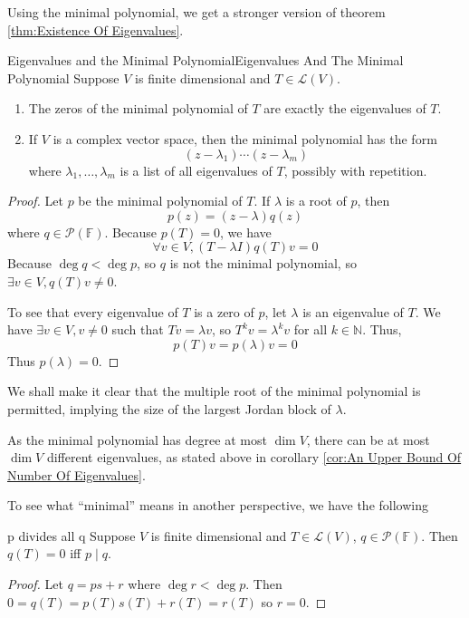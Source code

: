 \documentclass[../main.tex]{subfiles}
\begin{document}
Using the minimal polynomial, we get a stronger version of theorem \ref{thm:Existence Of Eigenvalues}.
\begin{theorem}{Eigenvalues and the Minimal Polynomial}{Eigenvalues And The Minimal Polynomial}
Suppose $V$ is finite dimensional and $T\in \mathscr{L}(V)$.
\begin{enumerate}
	\item The zeros of the minimal polynomial of $T$ are exactly the eigenvalues of $T$.
	\item If $V$ is a complex vector space, then the minimal polynomial has the form
		\begin{equation*}
			(z-\lambda_1) \cdots (z-\lambda_m)
		\end{equation*}
	where $\lambda_1, \ldots ,\lambda_m$ is a list of all eigenvalues of $T$, possibly with repetition.
\end{enumerate}
\end{theorem}
\begin{proof}
Let $p$ be the minimal polynomial of $T$. If $\lambda$ is a root of $p$, then
\begin{equation*}
p(z) = (z-\lambda)q(z)
\end{equation*}
where $q\in \mathscr{P}(\mathbb{F})$. Because $p(T) = 0$, we have
\begin{equation*}
	\forall v\in V, (T-\lambda I)q(T)v = 0
\end{equation*}
Because $\deg q< \deg p$, so $q$ is not the minimal polynomial, so $\exists v\in V, q(T)v\neq 0$. 

To see that every eigenvalue of $T$ is a zero of $p$, let $\lambda$ is an eigenvalue of $T$. We have $\exists v\in V,v\neq 0$ such that $Tv = \lambda v$, so $T^kv = \lambda^kv$ for all $k\in \mathbb{N}$. Thus,
\begin{equation*}
p(T)v = p(\lambda)v=0
\end{equation*}
Thus $p(\lambda) = 0$.
\end{proof}

\begin{remark}
We shall make it clear that the multiple root of the minimal polynomial is permitted, implying the size of the largest Jordan block of $\lambda$.

As the minimal polynomial has degree at most $\dim V$, there can be at most $\dim V$ different eigenvalues, as stated above in corollary \ref{cor:An Upper Bound Of Number Of Eigenvalues}.
\end{remark}

To see what ``minimal'' means in another perspective, we have the following
\begin{theorem}{}{p divides all q}
Suppose $V$ is finite dimensional and $T\in \mathscr{L}(V)$, $q\in \mathscr{P}(\mathbb{F})$. Then $q(T) = 0$ iff $p \mid q$.
\end{theorem}
\begin{proof}
Let $q=ps+r$ where $\deg r<\deg p$. Then $0 = q(T) = p(T)s(T)+r(T) = r(T)$ so $r=0$.
\end{proof}
\end{document}
